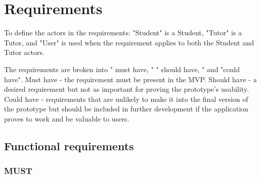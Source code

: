 \section{Requirements}

To define the actors in the requirements: "Student" is a Student, "Tutor" is a Tutor, and "User" is used when the requirement applies to both the Student and Tutor actors.

The requirements are broken into " must have, " " should have, " and "could have". Must have - the requirement must be present in the MVP. Should have - a desired requirement but not as important for proving the prototype's usability. Could have - requirements that are unlikely to make it into the final version of the prototype but should be included in further development if the application proves to work and be valuable to users.

\subsection{Functional requirements}
\subsubsection{MUST}

